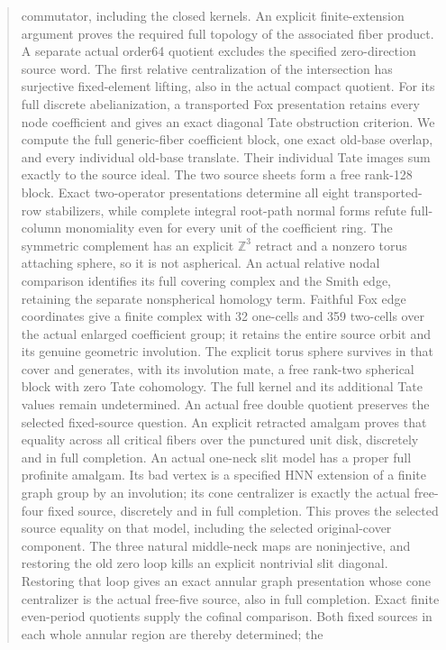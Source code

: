 \documentclass[11pt,a4paper]{article}
\begin{document}
\begin{abstract}
commutator, including the closed kernels. An explicit finite-extension
argument proves the required full topology of the associated fiber
product. A separate actual order64 quotient excludes the specified
zero-direction source word. The first relative centralization of the
intersection has surjective fixed-element lifting, also in the actual
compact quotient. For its full discrete abelianization, a transported
Fox presentation retains every node coefficient and gives an exact
diagonal Tate obstruction criterion. We compute the full generic-fiber
coefficient block, one exact old-base overlap, and every individual
old-base translate. Their individual Tate images sum exactly to the
source ideal. The two source sheets form a free rank-128 block.
Exact two-operator presentations determine all eight transported-row
stabilizers, while complete integral root-path normal forms refute
full-column monomiality even for every unit of the coefficient ring.
The symmetric complement has an explicit $\mathbb Z^3$ retract and a
nonzero torus attaching sphere, so it is not aspherical. An actual
relative nodal comparison identifies its full covering complex and the
Smith edge, retaining the separate nonspherical homology term. Faithful
Fox edge coordinates give a finite complex with 32 one-cells and 359
two-cells over the actual enlarged coefficient group; it retains the
entire source orbit and its genuine geometric involution. The explicit
torus sphere survives in that cover and generates, with its involution
mate, a free rank-two spherical block with zero Tate cohomology. The
full kernel and its additional Tate values remain undetermined. An actual
free double quotient preserves the selected fixed-source question.
An explicit retracted amalgam proves that equality across all critical
fibers over the punctured unit disk, discretely and in full completion.
An actual one-neck slit model has a proper full profinite amalgam.
Its bad vertex is a specified HNN extension of a finite graph group by
an involution; its cone centralizer is exactly the actual free-four
fixed source, discretely and in full completion. This proves the selected
source equality on that model, including the selected original-cover
component. The three natural middle-neck maps are noninjective, and
restoring the old zero loop kills an explicit nontrivial slit diagonal.
Restoring that loop gives an exact annular graph presentation whose
cone centralizer is the actual free-five source, also in full completion.
Exact finite even-period quotients supply the cofinal comparison. Both
fixed sources in each whole annular region are thereby determined; the

\end{abstract}
\end{document}

